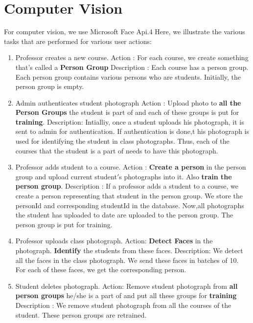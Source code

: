 \documentclass[paper=a4, fontsize=15pt]{scrartcl}
\begin{document}
\section{{Computer Vision}}

For computer vision, we use Microsoft Face Api.4 \newline
Here, we illustrate the various tasks that are performed for various user actions:

\begin{enumerate}
    \item Professor creates a new course. \newline 
    Action : For each course, we create something that's called a \textbf{Person Group} \newline
    Description : Each course has a person group. Each person group contains various persons who are students. Initially, the person group is empty.
    \item Admin authenticates student photograph \newline
    Action : Upload photo to \textbf{all the Person Groups} the student is part of and each of these groups is put for \textbf{training}.\newline
Description: Intialliy, once a student uploads his photograph, it is sent to admin for authentication. If authentication is done,t his photograph is used for identifying the student in class photographs. Thus, each of the courses that the student is a part of needs to have this photograph.
	\item Professor adds student to a course.\newline
    Action : \textbf{Create a person} in the person group and upload current student$'$s photographs into it. Also \textbf{train the person group}. \newline
    Description : If a professor adds a student to a course, we create a person representing that student in the person group. We store the personId and corresponding studentId in the database. Now,all photographs the student has uploaded to date are uploaded to the person group. The person group is put for training.
    \pagebreak
    \item Professor uploads class photograph. \newline
    Action: \textbf{Detect Faces} in the photograph. \textbf{Identify} the students from these faces.\newline
    Description: We detect all the faces in the class photograph. We send these faces in batches of 10. For each of these faces, we get the corresponding person.
    \item Student deletes photograph. \newline
    Action: Remove student photograph from \textbf{all person groups} he/she is a part of and put all these groups for \textbf{training} \newline
    Description : We remove student photograph from all the courses of the student. These person groups are retrained.
\end{enumerate}
\end{document}
